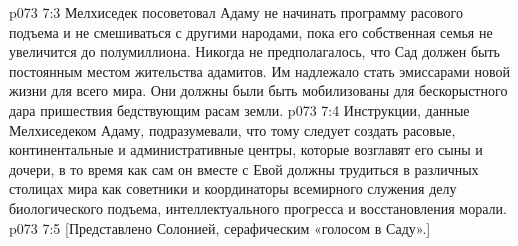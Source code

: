 \vs p073 7:3 \pc Мелхиседек посоветовал Адаму не начинать программу расового подъема и не смешиваться с другими народами, пока его собственная семья не увеличится до полумиллиона. Никогда не предполагалось, что Сад должен быть постоянным местом жительства адамитов. Им надлежало стать эмиссарами новой жизни для всего мира. Они должны были быть мобилизованы для бескорыстного дара пришествия бедствующим расам земли.
\vs p073 7:4 Инструкции, данные Мелхиседеком Адаму, подразумевали, что тому следует создать расовые, континентальные и административные центры, которые возглавят его сыны и дочери, в то время как сам он вместе с Евой должны трудиться в различных столицах мира как советники и координаторы всемирного служения делу биологического подъема, интеллектуального прогресса и восстановления морали.
\vsetoff
\vs p073 7:5 [Представлено Солонией, серафическим «голосом в Саду».]
